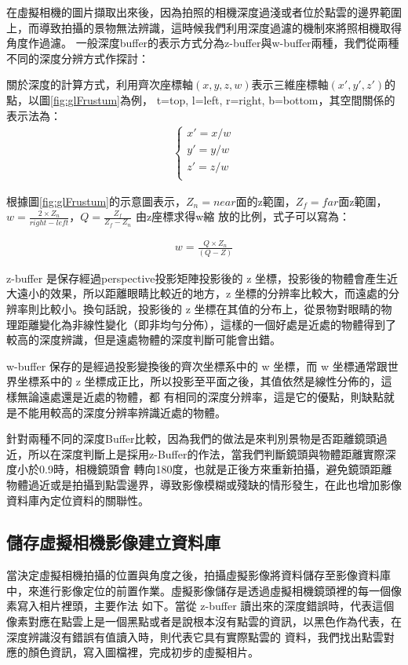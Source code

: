 	在虛擬相機的圖片擷取出來後，因為拍照的相機深度過淺或者位於點雲的邊界範圍上，而導致拍攝的景物無法辨識，這時候我們利用深度過濾的機制來將照相機取得角度作過濾。
	一般深度buffer的表示方式分為z-buffer與w-buffer兩種，我們從兩種不同的深度分辨方式作探討：
	
	關於深度的計算方式，利用齊次座標軸$(x,y,z,w)$表示三維座標軸$(x',y',z')$的點，以圖\ref{fig:glFrustum}為例，
	t=top, l=left, r=right, b=bottom，其空間關係的表示法為：
	\begin{align}
		\left\{
		\begin{array}{ccc}
		x' = x /w \\
		y' = y /w \\
		z' = z /w \\
		\end{array}
		\right.
	\end{align}
	
	根據圖\ref{fig:glFrustum}的示意圖表示，$Z_n = near$面的z範圍，$Z_f = far$面z範圍，$w = \frac{2 \times Z_n}{right-left}$，$Q = \frac{Z_f}{Z_f - Z_n}$ 由z座標求得w縮
	放的比例，式子可以寫為：
		
	\begin{align}
		w = \frac{Q\times Z_n}{(Q-Z)}
	\end{align}			
	
	z-buffer 是保存經過perspective投影矩陣投影後的 z 坐標，投影後的物體會產生近大遠小的效果，所以距離眼睛比較近的地方，z 坐標的分辨率比較大，而遠處的分辨率則比較小。換句話說，投影後的
    z 坐標在其值的分布上，從景物對眼睛的物理距離變化為非線性變化（即非均勻分佈），這樣的一個好處是近處的物體得到了較高的深度辨識，但是遠處物體的深度判斷可能會出錯。 
    
    w-buffer 保存的是經過投影變換後的齊次坐標系中的 w 坐標，而 w 坐標通常跟世界坐標系中的 z 坐標成正比，所以投影至平面之後，其值依然是線性分佈的，這樣無論遠處還是近處的物體，都
    有相同的深度分辨率，這是它的優點，則缺點就是不能用較高的深度分辨率辨識近處的物體。
    
    針對兩種不同的深度Buffer比較，因為我們的做法是來判別景物是否距離鏡頭過近，所以在深度判斷上是採用z-Buffer的作法，當我們判斷鏡頭與物體距離實際深度小於0.9時，相機鏡頭會
    轉向180度，也就是正後方來重新拍攝，避免鏡頭距離物體過近或是拍攝到點雲邊界，導致影像模糊或殘缺的情形發生，在此也增加影像資料庫內定位資料的關聯性。

\subsection{儲存虛擬相機影像建立資料庫}
%
	當決定虛擬相機拍攝的位置與角度之後，拍攝虛擬影像將資料儲存至影像資料庫中，來進行影像定位的前置作業。虛擬影像儲存是透過虛擬相機鏡頭裡的每一個像素寫入相片裡頭，主要作法
	如下。當從 z-buffer 讀出來的深度錯誤時，代表這個像素對應在點雲上是一個黑點或者是說根本沒有點雲的資訊，以黑色作為代表，在深度辨識沒有錯誤有值讀入時，則代表它具有實際點雲的
	資料，我們找出點雲對應的顏色資訊，寫入圖檔裡，完成初步的虛擬相片。
	
